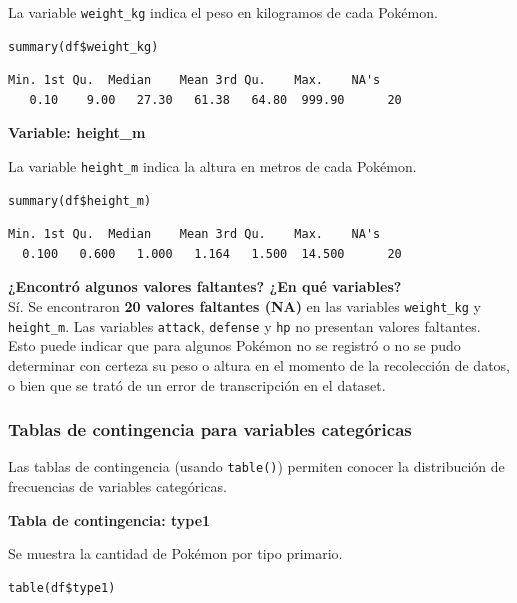 \documentclass[11pt,a4paper]{article}
\begin{document}
La variable \texttt{weight\_kg} indica el peso en kilogramos de cada Pokémon.

\begin{lstlisting}[style=Rstyle]
summary(df$weight_kg)
\end{lstlisting}

\begin{lstlisting}[style=Routput]
   Min. 1st Qu.  Median    Mean 3rd Qu.    Max.    NA's
   0.10    9.00   27.30   61.38   64.80  999.90      20
\end{lstlisting}

\textbf{Variable: height\_m}

La variable \texttt{height\_m} indica la altura en metros de cada Pokémon.

\begin{lstlisting}[style=Rstyle]
summary(df$height_m)
\end{lstlisting}

\begin{lstlisting}[style=Routput]
   Min. 1st Qu.  Median    Mean 3rd Qu.    Max.    NA's
  0.100   0.600   1.000   1.164   1.500  14.500      20
\end{lstlisting}

\begin{pregunta}
\textbf{¿Encontró algunos valores faltantes? ¿En qué variables?}\\[4pt]
Sí. Se encontraron \textbf{20 valores faltantes (NA)} en las variables \texttt{weight\_kg} y
\texttt{height\_m}. Las variables \texttt{attack}, \texttt{defense} y \texttt{hp} no presentan
valores faltantes. Esto puede indicar que para algunos Pokémon no se registró o no se pudo determinar
con certeza su peso o altura en el momento de la recolección de datos, o bien que se trató de un
error de transcripción en el dataset.
\end{pregunta}

\subsubsection{Tablas de contingencia para variables categóricas}

Las tablas de contingencia (usando \texttt{table()}) permiten conocer la distribución de
frecuencias de variables categóricas.

\textbf{Tabla de contingencia: type1}

Se muestra la cantidad de Pokémon por tipo primario.

\begin{lstlisting}[style=Rstyle]
table(df$type1)
\end{lstlisting}
\end{document}
